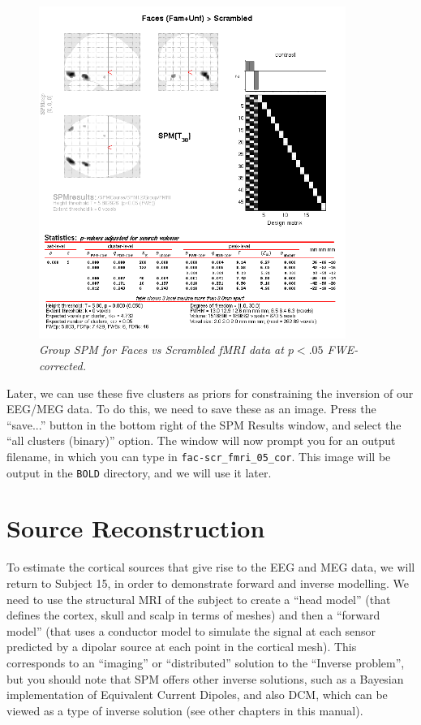 \begin{figure}
\begin{center}
\includegraphics[width=100mm]{multi/figures/figure11}
\caption{\em Group SPM for Faces vs Scrambled fMRI data at \(p<.05\) FWE-corrected. \label{multi:fig:11}}
\end{center}
\end{figure}

Later, we can use these five clusters as priors for constraining the inversion of our EEG/MEG data. To do this, we need to save these as an image. Press the ``save...'' button in the bottom right of the SPM Results window, and select the ``all clusters (binary)'' option. The window will now prompt you for an output filename, in which you can type in \texttt{fac-scr\_fmri\_05\_cor}. This image will be output in the \texttt{BOLD} directory, and we will use it later.

\section{Source Reconstruction}

To estimate the cortical sources that give rise to the EEG and MEG data, we will return to Subject 15, in order to demonstrate forward and inverse modelling. We need to use the structural MRI of the subject to create a ``head model'' (that defines the cortex, skull and scalp in terms of meshes) and then a ``forward model'' (that uses a conductor model to simulate the signal at each sensor predicted by a dipolar source at each point in the cortical mesh). This corresponds to an ``imaging'' or ``distributed'' solution to the ``Inverse problem'', but you should note that SPM offers other inverse solutions, such as a Bayesian implementation of Equivalent Current Dipoles, and also DCM, which can be viewed as a type of inverse solution (see other chapters in this manual).

